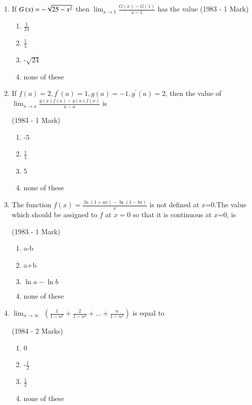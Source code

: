 \documentclass[journal,12pt,onecolumn]{IEEEtran}
\theoremstyle{remark}
\begin{document}
\begin{enumerate}
\begin{enumerate}
          
          
           
    \end{enumerate}

\item If $G\left(x\right)=-\sqrt{25-x^2}$ then $\lim_{x \to 1}\frac{G(x)-G(1)}{x-1}$ has the value
\hfill    (1983 - 1 Mark)
\begin{enumerate}
    \item $\frac{1}{24}$
    \item $\frac{1}{5}$
    \item -$\sqrt{24}$
    \item none of these
    
\end{enumerate}

\item If $f(a)=2,f^{\prime}(a)=1,g(a)=-1,g^{\prime}(a)=2$, then the value of $\lim_{x\to a}\frac{g(x)f(a)-g(a)f(x)}{x-a}$ is

  \hfill (1983 - 1 Mark)
     \begin{enumerate}
         \item -5
         \item $\frac{1}{5}$
         \item 5
         \item none of these
     \end{enumerate}

\item The function $f(x)=\frac{\ln{(1+ax)}-\ln{(1-bx)}}{x}$ is not defined at $x$=0.The value which should be assigned to $f$ at $x=0$ so that it is continuous at $x$=0, is

  \hfill              (1983 - 1 Mark)
    \begin{enumerate}
        \item a-b
        \item a+b
        \item $\ln{a}-\ln{b}$
        \item none of these
        
    \end{enumerate}

\item $\lim_{n\to \infty}$
      $\left(
      \frac{1}{1-n^2} + \frac{2}{1-n^2} +...+ \frac{n}{1-n^2}
       \right)$ is equal to
       
             \hfill(1984 - 2 Marks)
                 \begin{enumerate}
                    \item 0
                    \item -$\frac{1}{2}$
                    \item $\frac{1}{2}$
                    \item none of these
             

\end{enumerate}
\end{enumerate}
\end{document}
